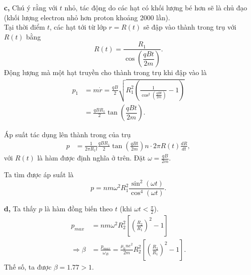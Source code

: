 \textbf{c,} Chú ý rằng với $t$ nhỏ, tác động do các hạt có khối lượng bé hơn sẽ là chủ đạo (khối lượng electron nhỏ hơn proton khoảng 2000 lần).\\
Tại thời điểm $t$, các hạt tới từ lớp $r = R(t)$ sẽ đập vào thành trong trụ với $R(t)$ bằng
\begin{equation} \label{eq10_p3_d2}
R(t) = \frac{R_1}{\cos\left(\dfrac{qBt}{2m}\right)}.
\end{equation}
Động lượng mà một hạt truyền cho thành trong trụ khi đập vào là
\begin{equation} \label{eq11_p3_d2}
\begin{split}
p_1 &= m \dot{r}= \frac{qB}{2} \sqrt{R_1^2 \left(\frac{1}{\cos^2 \left(\frac{qBt}{2m}\right)}-1\right)}\\
&= \frac{qBR_1}{2} \tan\left( \dfrac{qBt}{2m}\right).
\end{split}
\end{equation}

Áp suất tác dụng lên thành trong của trụ
\begin{equation} \label{eq12_p3_d2}
\begin{split}
p &= \frac{1}{2\pi R_1 l} \frac{qBR_1}{2} \tan \left(\frac{qBt}{2m}\right) n \cdot 2\pi R(t) \frac{d R}{d t},
\end{split}
\end{equation}
với $R(t)$ là hàm được định nghĩa ở trên.
Đặt $\displaystyle \omega = \frac{qB}{2m}$. 

Ta tìm được áp suất là
\begin{equation} \label{eq13_p3_d2}
p = nm \omega^2 R_1^2 \frac{\sin^2(\omega t)}{\cos^4(\omega t)}.
\end{equation}

\textbf{d,} Ta thấy $p$ là hàm đồng biến theo $t$ (khi $\displaystyle \omega t < \frac{\pi}{2}$).
\begin{equation} \label{eq14_p3_d2}
\begin{split}
p_{max} &= nm \omega ^2 R_2^2 \left[\left(\frac{R_2}{R_1}\right)^2 - 1\right]\\
\Rightarrow \beta &= \frac{p_{max}}{\omega_B} = \frac{\mu_0 n e^2}{2m} R_2^2 \left[\left(\frac{R_2}{R_1}\right)^2 - 1\right].   
\end{split}
\end{equation}
Thế số, ta được $\beta = 1.77 > 1$.

